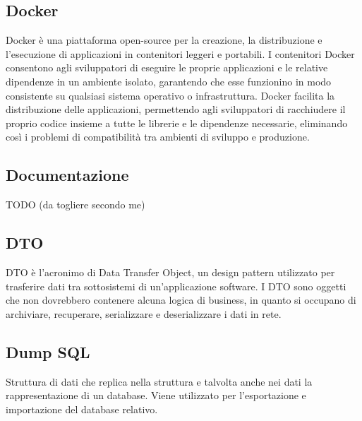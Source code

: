 \subsection*{Docker}
Docker è una piattaforma open-source per la creazione, la distribuzione e l'esecuzione di applicazioni in contenitori leggeri e portabili. I contenitori Docker consentono agli sviluppatori di eseguire le proprie applicazioni e le relative dipendenze in un ambiente isolato, garantendo che esse funzionino in modo consistente su qualsiasi sistema operativo o infrastruttura. Docker facilita la distribuzione delle applicazioni, permettendo agli sviluppatori di racchiudere il proprio codice insieme a tutte le librerie e le dipendenze necessarie, eliminando così i problemi di compatibilità tra ambienti di sviluppo e produzione.

\vspace{2em}
\subsection*{Documentazione}
TODO (da togliere secondo me)

\vspace{2em}
\subsection*{DTO}
DTO è l'acronimo di Data Transfer Object, un design pattern utilizzato per trasferire dati tra sottosistemi di un'applicazione software. I DTO sono oggetti che non dovrebbero contenere alcuna logica di business, in quanto si occupano di archiviare, recuperare, serializzare e deserializzare i dati in rete.

\vspace{2em}
\subsection*{Dump SQL}
Struttura di dati che replica nella struttura e talvolta anche nei dati la rappresentazione di un database. Viene utilizzato per l'esportazione e importazione del database relativo.
